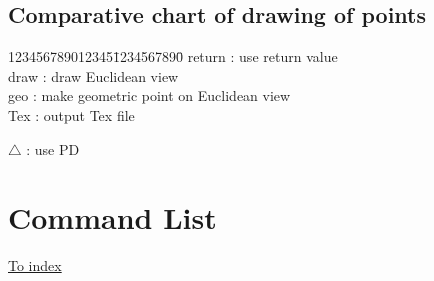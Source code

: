 \documentclass[papersize,a4paper,12pt]{article}
\begin{document}
\hypertarget{mkpttable}{}
\subsection{Comparative chart of drawing of points}
\begin{tabbing}
123456789012345\=1234567890\=\kill
 \> return \>: use return value\\
 \> draw \>: draw Euclidean view\\
 \> geo \>: make geometric point on Euclidean view\\
 \> Tex \>: output Tex file
\end{tabbing}

\begin{center}

\end{center}

\hspace{20mm} $\triangle$ : use PD

\newpage
\hypertarget{functionlist}{}
\section{Command List}
\hyperlink{index}{To index}
\end{document}
